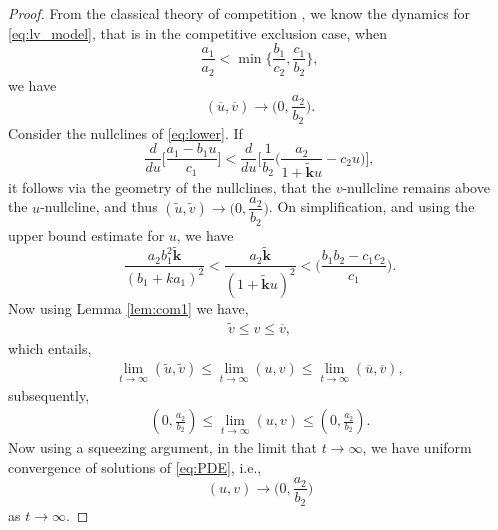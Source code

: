 \documentclass[10pt]{amsart}
\theoremstyle{definition}
\begin{document}
\begin{proof}
From the classical theory of competition \cite{Murray93}, we know the dynamics for \eqref{eq:lv_model}, that is in the competitive exclusion case, when
\[  \dfrac{a_1}{a_2} < \min \Big\{ \dfrac{b_1}{c_2},\dfrac{c_1}{b_2}  \Big\} , \]
we have 
\[ (\overline{u},\overline{v}) \to \Big(0,\dfrac{a_2}{b_2}\Big).\]
Consider the nullclines of \eqref{eq:lower}.  If
\[ \dfrac{d}{du} \Big[ \dfrac{a_1-b_1 u}{c_1} \Big] < \dfrac{d}{du} \Big[ \dfrac{1}{b_2} \Big( \dfrac{a_2}{1+ \mathbf{\widetilde{k}} u} -c_2 u \Big)\Big], \]
it follows via the geometry of the nullclines, that the $v$-nullcline remains above the $u$-nullcline, and thus
 $(\widetilde{u},\widetilde{v}) \to \Big(0, \dfrac{a_2}{b_2}\Big)$.
On simplification, and using the upper bound estimate for $u$, we have
\[ \dfrac{a_2 b_1^2 \mathbf{\widetilde{k}}}{(b_1 + k a_1)^2} < \dfrac{a_2 \mathbf{\widetilde{k}}} {(1+\mathbf{\widetilde{k}} u)^2}< \Big( \dfrac{b_1b_2 -c_1 c_2}{c_1} \Big). \]
Now using Lemma \ref{lem:com1} we have,
\begin{align*}
	\widetilde{v}	 \leq   v    \leq \overline{v},
\end{align*}
which entails,
\begin{align*}
	\lim_{t \rightarrow \infty}(\widetilde{u}, \widetilde{v})	 \leq  \lim_{t \rightarrow \infty} (u,v)    \leq \lim_{t \rightarrow \infty} (\overline{u},\overline{v}),
\end{align*}
subsequently,
\begin{align*}
	\left(0,\frac{a_{2}}{b_{2}}\right)	 \leq  \lim_{t \rightarrow \infty}   (u,v)    \leq 	\left(0,\frac{a_{2}}{b_{2}}\right).
\end{align*}
Now using a squeezing argument, in the limit that $t \rightarrow \infty$, we have uniform convergence of solutions of \eqref{eq:PDE}, i.e.,
\[ (u,v) \to \Big(0,\dfrac{a_2}{b_2}\Big) \] as $t \rightarrow \infty$.
\end{proof}
\end{document}
